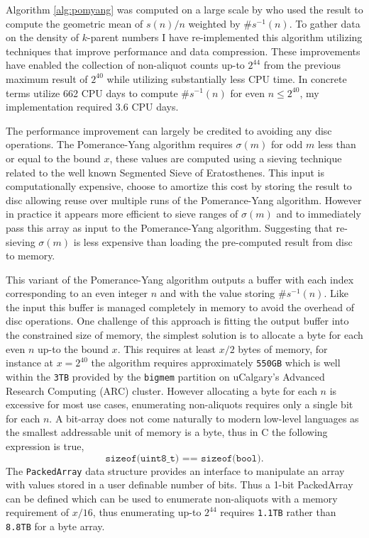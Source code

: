 \documentclass{article}
\theoremstyle{definition}
\begin{document}
Algorithm \ref{alg:pomyang} was computed on a large scale by \cite{chum_guy_jacobson_mosunov_2018} who used the result to compute the geometric mean of $s(n) / n$ weighted by $\#s^{-1}(n)$. To gather data on the density of $k$-parent numbers I have re-implemented this algorithm utilizing techniques that improve performance and data compression. These improvements have enabled the collection of non-aliquot counts up-to $2^{44}$ from the previous maximum result of $2^{40}$ while utilizing substantially less CPU time. In concrete terms \cite{chum_guy_jacobson_mosunov_2018} utilize 662 CPU days to compute $\#s^{-1}(n)$ for even $n \leq 2^{40}$, my implementation required 3.6 CPU days.

The performance improvement can largely be credited to avoiding any disc operations. The Pomerance-Yang algorithm requires $\sigma(m)$ for odd $m$ less than or equal to the bound $x$, these values are computed using a sieving technique related to the well known Segmented Sieve of Eratosthenes. This input is computationally expensive, \cite{chum_guy_jacobson_mosunov_2018} choose to amortize this cost by storing the result to disc allowing reuse over multiple runs of the Pomerance-Yang algorithm. However in practice it appears more efficient to sieve ranges of $\sigma(m)$ and to immediately pass this array as input to the Pomerance-Yang algorithm. Suggesting that re-sieving $\sigma(m)$ is less expensive than loading the pre-computed result from disc to memory.

This variant of the Pomerance-Yang algorithm outputs a buffer with each index corresponding to an even integer $n$ and with the value storing $\#s^{-1}(n)$. Like the input this buffer is managed completely in memory to avoid the overhead of disc operations. One challenge of this approach is fitting the output buffer into the constrained size of memory, the simplest solution is to allocate a byte for each even $n$ up-to the bound $x$. This requires at least $x/2$ bytes of memory, for instance at $x = 2^{40}$ the algorithm requires approximately \texttt{550GB} which is well within the \texttt{3TB} provided by the \texttt{bigmem} partition on uCalgary's Advanced Research Computing (ARC) cluster. However allocating a byte for each $n$ is excessive for most use cases, enumerating non-aliquots requires only a single bit for each $n$. A bit-array does not come naturally to modern low-level languages as the smallest addressable unit of memory is a byte, thus in C the following expression is true,
$$\texttt{sizeof(uint8\_t) == sizeof(bool)}.$$
The \texttt{PackedArray} data structure \cite{packedArray} provides an interface to manipulate an array with values stored in a user definable number of bits. Thus a 1-bit PackedArray can be defined which can be used to enumerate non-aliquots with a memory requirement of $x/16$, thus enumerating up-to $2^{44}$ requires \texttt{1.1TB} rather than \texttt{8.8TB} for a byte array.
\end{document}

